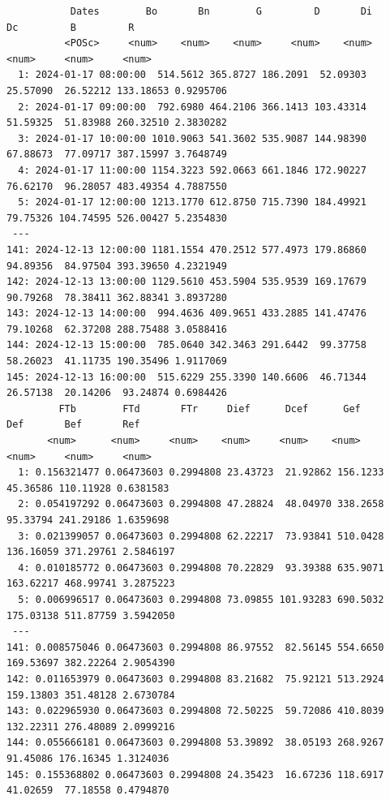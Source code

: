 \begin{itemize}
\begin{verbatim}
		   Dates        Bo       Bn        G         D       Di        Dc         B         R
		  <POSc>     <num>    <num>    <num>     <num>    <num>     <num>     <num>     <num>
  1: 2024-01-17 08:00:00  514.5612 365.8727 186.2091  52.09303 25.57090  26.52212 133.18653 0.9295706
  2: 2024-01-17 09:00:00  792.6980 464.2106 366.1413 103.43314 51.59325  51.83988 260.32510 2.3830282
  3: 2024-01-17 10:00:00 1010.9063 541.3602 535.9087 144.98390 67.88673  77.09717 387.15997 3.7648749
  4: 2024-01-17 11:00:00 1154.3223 592.0663 661.1846 172.90227 76.62170  96.28057 483.49354 4.7887550
  5: 2024-01-17 12:00:00 1213.1770 612.8750 715.7390 184.49921 79.75326 104.74595 526.00427 5.2354830
 ---                                                                                                 
141: 2024-12-13 12:00:00 1181.1554 470.2512 577.4973 179.86860 94.89356  84.97504 393.39650 4.2321949
142: 2024-12-13 13:00:00 1129.5610 453.5904 535.9539 169.17679 90.79268  78.38411 362.88341 3.8937280
143: 2024-12-13 14:00:00  994.4636 409.9651 433.2885 141.47476 79.10268  62.37208 288.75488 3.0588416
144: 2024-12-13 15:00:00  785.0640 342.3463 291.6442  99.37758 58.26023  41.11735 190.35496 1.9117069
145: 2024-12-13 16:00:00  515.6229 255.3390 140.6606  46.71344 26.57138  20.14206  93.24874 0.6984426
	     FTb        FTd       FTr     Dief      Dcef      Gef       Def       Bef       Ref
	   <num>      <num>     <num>    <num>     <num>    <num>     <num>     <num>     <num>
  1: 0.156321477 0.06473603 0.2994808 23.43723  21.92862 156.1233  45.36586 110.11928 0.6381583
  2: 0.054197292 0.06473603 0.2994808 47.28824  48.04970 338.2658  95.33794 241.29186 1.6359698
  3: 0.021399057 0.06473603 0.2994808 62.22217  73.93841 510.0428 136.16059 371.29761 2.5846197
  4: 0.010185772 0.06473603 0.2994808 70.22829  93.39388 635.9071 163.62217 468.99741 3.2875223
  5: 0.006996517 0.06473603 0.2994808 73.09855 101.93283 690.5032 175.03138 511.87759 3.5942050
 ---                                                                                           
141: 0.008575046 0.06473603 0.2994808 86.97552  82.56145 554.6650 169.53697 382.22264 2.9054390
142: 0.011653979 0.06473603 0.2994808 83.21682  75.92121 513.2924 159.13803 351.48128 2.6730784
143: 0.022965930 0.06473603 0.2994808 72.50225  59.72086 410.8039 132.22311 276.48089 2.0999216
144: 0.055666181 0.06473603 0.2994808 53.39892  38.05193 268.9267  91.45086 176.16345 1.3124036
145: 0.155368802 0.06473603 0.2994808 24.35423  16.67236 118.6917  41.02659  77.18558 0.4794870
\end{verbatim}


\end{itemize}
